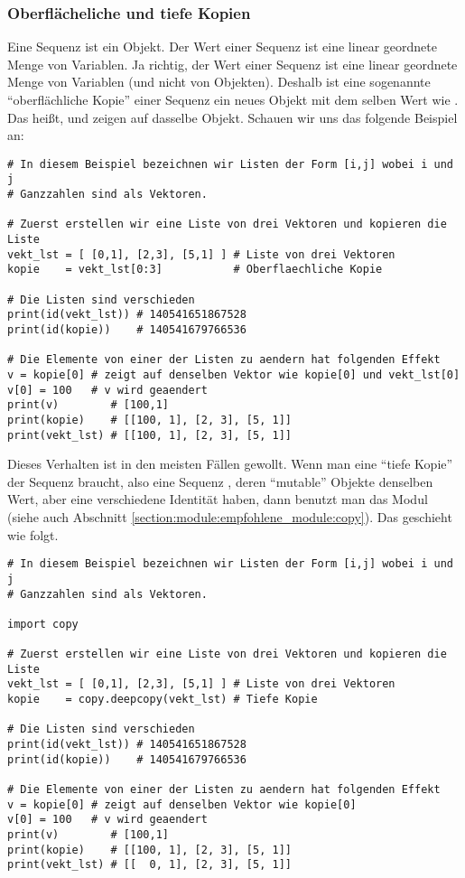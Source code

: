 \subsubsection{Oberflächeliche und tiefe Kopien}
\label{section:std_data_types:sequenzen:kopien}
Eine Sequenz ist ein Objekt.
Der Wert einer Sequenz ist eine linear geordnete Menge von Variablen.
Ja richtig, der Wert einer Sequenz ist eine linear geordnete Menge von Variablen (und nicht von Objekten).
Deshalb ist eine sogenannte ``oberflächliche Kopie'' einer Sequenz  ein neues Objekt  mit dem selben Wert wie .
Das heißt,  und  zeigen auf dasselbe Objekt.
Schauen wir uns das folgende Beispiel an:
\begin{lstlisting}
# In diesem Beispiel bezeichnen wir Listen der Form [i,j] wobei i und j
# Ganzzahlen sind als Vektoren.

# Zuerst erstellen wir eine Liste von drei Vektoren und kopieren die Liste
vekt_lst = [ [0,1], [2,3], [5,1] ] # Liste von drei Vektoren
kopie    = vekt_lst[0:3]           # Oberflaechliche Kopie

# Die Listen sind verschieden
print(id(vekt_lst)) # 140541651867528
print(id(kopie))    # 140541679766536

# Die Elemente von einer der Listen zu aendern hat folgenden Effekt
v = kopie[0] # zeigt auf denselben Vektor wie kopie[0] und vekt_lst[0]
v[0] = 100   # v wird geaendert
print(v)        # [100,1]
print(kopie)    # [[100, 1], [2, 3], [5, 1]]
print(vekt_lst) # [[100, 1], [2, 3], [5, 1]]
\end{lstlisting}

Dieses Verhalten ist in den meisten Fällen gewollt.
Wenn man eine ``tiefe Kopie'' der Sequenz  braucht, also eine Sequenz ,
deren ``mutable'' Objekte denselben Wert, aber eine verschiedene Identität haben, dann benutzt man das Modul 
(siehe auch Abschnitt \ref{section:module:empfohlene_module:copy}).
Das geschieht wie folgt.
\begin{lstlisting}
# In diesem Beispiel bezeichnen wir Listen der Form [i,j] wobei i und j
# Ganzzahlen sind als Vektoren.

import copy

# Zuerst erstellen wir eine Liste von drei Vektoren und kopieren die Liste
vekt_lst = [ [0,1], [2,3], [5,1] ] # Liste von drei Vektoren
kopie    = copy.deepcopy(vekt_lst) # Tiefe Kopie

# Die Listen sind verschieden
print(id(vekt_lst)) # 140541651867528
print(id(kopie))    # 140541679766536

# Die Elemente von einer der Listen zu aendern hat folgenden Effekt
v = kopie[0] # zeigt auf denselben Vektor wie kopie[0]
v[0] = 100   # v wird geaendert
print(v)        # [100,1]
print(kopie)    # [[100, 1], [2, 3], [5, 1]]
print(vekt_lst) # [[  0, 1], [2, 3], [5, 1]]
\end{lstlisting}


